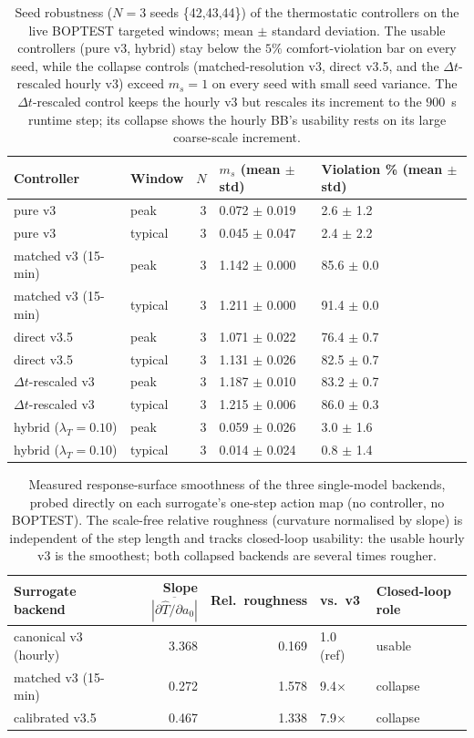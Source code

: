 \documentclass[11pt,a4paper]{article}
\begin{document}
\begin{table}[H]
\centering
\caption{Seed robustness ($N=3$ seeds \{42,43,44\}) of the thermostatic controllers on the live BOPTEST targeted windows; mean $\pm$ standard deviation. The usable controllers (pure v3, hybrid) stay below the $5\%$ comfort-violation bar on every seed, while the collapse controls (matched-resolution v3, direct v3.5, and the $\Delta t$-rescaled hourly v3) exceed $m_s=1$ on every seed with small seed variance. The $\Delta t$-rescaled control keeps the hourly v3 but rescales its increment to the $900$~s runtime step; its collapse shows the hourly BB's usability rests on its large coarse-scale increment.}
\label{tab:seed_band}
\small
\begin{tabular}{llrll}
\toprule
Controller & Window & $N$ & $m_s$ (mean $\pm$ std) & Violation \% (mean $\pm$ std) \\
\midrule
pure v3 & peak & 3 & 0.072 $\pm$ 0.019 & 2.6 $\pm$ 1.2 \\
pure v3 & typical & 3 & 0.045 $\pm$ 0.047 & 2.4 $\pm$ 2.2 \\
matched v3 (15-min) & peak & 3 & 1.142 $\pm$ 0.000 & 85.6 $\pm$ 0.0 \\
matched v3 (15-min) & typical & 3 & 1.211 $\pm$ 0.000 & 91.4 $\pm$ 0.0 \\
direct v3.5 & peak & 3 & 1.071 $\pm$ 0.022 & 76.4 $\pm$ 0.7 \\
direct v3.5 & typical & 3 & 1.131 $\pm$ 0.026 & 82.5 $\pm$ 0.7 \\
$\Delta t$-rescaled v3 & peak & 3 & 1.187 $\pm$ 0.010 & 83.2 $\pm$ 0.7 \\
$\Delta t$-rescaled v3 & typical & 3 & 1.215 $\pm$ 0.006 & 86.0 $\pm$ 0.3 \\
hybrid ($\lambda_T{=}0.10$) & peak & 3 & 0.059 $\pm$ 0.026 & 3.0 $\pm$ 1.6 \\
hybrid ($\lambda_T{=}0.10$) & typical & 3 & 0.014 $\pm$ 0.024 & 0.8 $\pm$ 1.4 \\
\bottomrule
\end{tabular}
\end{table}
\begin{table}[H]
\centering
\caption{Measured response-surface smoothness of the three single-model backends, probed directly on each surrogate's one-step action map (no controller, no BOPTEST). The scale-free relative roughness (curvature normalised by slope) is independent of the step length and tracks closed-loop usability: the usable hourly v3 is the smoothest; both collapsed backends are several times rougher.}
\label{tab:surface_sharpness}
\small
\begin{tabular}{lrrll}
\toprule
Surrogate backend & Slope $\overline{|\partial\hat T/\partial a_0|}$ & Rel.\ roughness & vs.\ v3 & Closed-loop role \\
\midrule
canonical v3 (hourly) & 3.368 & 0.169 & 1.0 (ref) & usable \\
matched v3 (15-min) & 0.272 & 1.578 & 9.4$\times$ & collapse \\
calibrated v3.5 & 0.467 & 1.338 & 7.9$\times$ & collapse \\
\bottomrule
\end{tabular}
\end{table}
\end{document}
